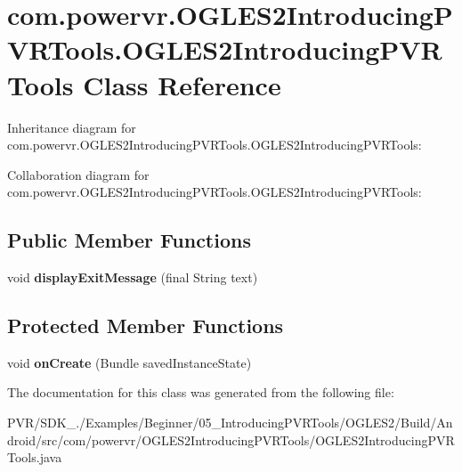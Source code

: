 \hypertarget{classcom_1_1powervr_1_1_o_g_l_e_s2_introducing_p_v_r_tools_1_1_o_g_l_e_s2_introducing_p_v_r_tools}{\section{com.\+powervr.\+O\+G\+L\+E\+S2\+Introducing\+P\+V\+R\+Tools.\+O\+G\+L\+E\+S2\+Introducing\+P\+V\+R\+Tools Class Reference}
\label{classcom_1_1powervr_1_1_o_g_l_e_s2_introducing_p_v_r_tools_1_1_o_g_l_e_s2_introducing_p_v_r_tools}
}


Inheritance diagram for com.\+powervr.\+O\+G\+L\+E\+S2\+Introducing\+P\+V\+R\+Tools.\+O\+G\+L\+E\+S2\+Introducing\+P\+V\+R\+Tools\+:


Collaboration diagram for com.\+powervr.\+O\+G\+L\+E\+S2\+Introducing\+P\+V\+R\+Tools.\+O\+G\+L\+E\+S2\+Introducing\+P\+V\+R\+Tools\+:
\subsection*{Public Member Functions}
\begin{DoxyCompactItemize}
\item 
\hypertarget{classcom_1_1powervr_1_1_o_g_l_e_s2_introducing_p_v_r_tools_1_1_o_g_l_e_s2_introducing_p_v_r_tools_a873c94dff4a1b379d3e2ae0eeba1be78}{void {\bfseries display\+Exit\+Message} (final String text)}\label{classcom_1_1powervr_1_1_o_g_l_e_s2_introducing_p_v_r_tools_1_1_o_g_l_e_s2_introducing_p_v_r_tools_a873c94dff4a1b379d3e2ae0eeba1be78}

\end{DoxyCompactItemize}
\subsection*{Protected Member Functions}
\begin{DoxyCompactItemize}
\item 
\hypertarget{classcom_1_1powervr_1_1_o_g_l_e_s2_introducing_p_v_r_tools_1_1_o_g_l_e_s2_introducing_p_v_r_tools_abbb60708e01a922d2704369d0a43b3fa}{void {\bfseries on\+Create} (Bundle saved\+Instance\+State)}\label{classcom_1_1powervr_1_1_o_g_l_e_s2_introducing_p_v_r_tools_1_1_o_g_l_e_s2_introducing_p_v_r_tools_abbb60708e01a922d2704369d0a43b3fa}

\end{DoxyCompactItemize}


The documentation for this class was generated from the following file\+:\begin{DoxyCompactItemize}
\item 
P\+V\+R/\+S\+D\+K\+\_./\+Examples/\+Beginner/05\+\_\+\+Introducing\+P\+V\+R\+Tools/\+O\+G\+L\+E\+S2/\+Build/\+Android/src/com/powervr/\+O\+G\+L\+E\+S2\+Introducing\+P\+V\+R\+Tools/O\+G\+L\+E\+S2\+Introducing\+P\+V\+R\+Tools.\+java\end{DoxyCompactItemize}
